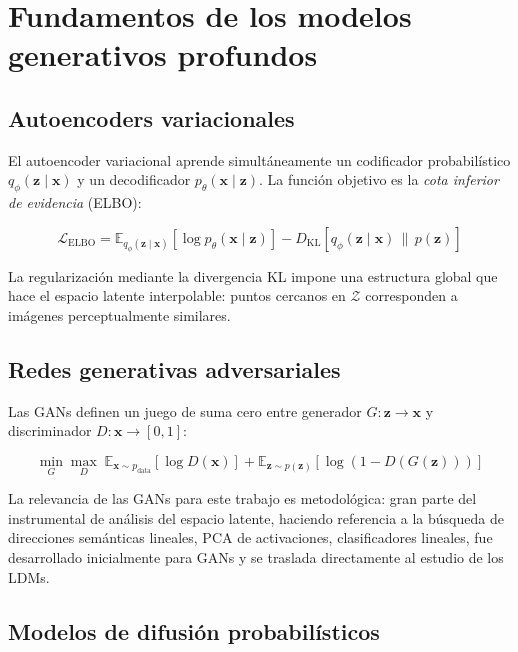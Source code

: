 \documentclass[12pt, a4paper, twoside]{book}
\newcommand{\z}{\mathbf{z}}
\newcommand{\x}{\mathbf{x}}
\newcommand{\E}{\mathbb{E}}
\begin{document}
\section{Fundamentos de los modelos generativos profundos}
\label{sec:fundamentos}

\subsection{Autoencoders variacionales}

El autoencoder variacional \citep{kingma2013vae} aprende simultáneamente un codificador probabilístico $q_\phi(\z \mid \x)$ y un decodificador $p_\theta(\x \mid \z)$. La función objetivo es la \textit{cota inferior de evidencia} (ELBO):

\begin{equation}
\mathcal{L}_{\text{ELBO}} = \E_{q_\phi(\z \mid \x)}\!\left[\log p_\theta(\x \mid \z)\right]
  - D_{\mathrm{KL}}\!\left[q_\phi(\z \mid \x) \,\|\, p(\z)\right]
\label{eq:elbo}
\end{equation}

La regularización mediante la divergencia KL impone una estructura global que hace el espacio latente interpolable: puntos cercanos en $\mathcal{Z}$ corresponden a imágenes perceptualmente similares.

\subsection{Redes generativas adversariales}

Las GANs \citep{goodfellow2014gans} definen un juego de suma cero entre generador $G: \z \rightarrow \x$ y discriminador $D: \x \rightarrow [0,1]$:

\begin{equation}
\min_G \max_D \;\E_{\x \sim p_{\text{data}}}\!\left[\log D(\x)\right]
+ \E_{\z \sim p(\z)}\!\left[\log\!\left(1 - D(G(\z))\right)\right]
\end{equation}

La relevancia de las GANs para este trabajo es metodológica: gran parte del instrumental de análisis del espacio latente, haciendo referencia a la búsqueda de direcciones semánticas lineales, PCA de activaciones, clasificadores lineales, fue desarrollado inicialmente para GANs y se traslada directamente al estudio de los LDMs.

\subsection{Modelos de difusión probabilísticos}
\end{document}

